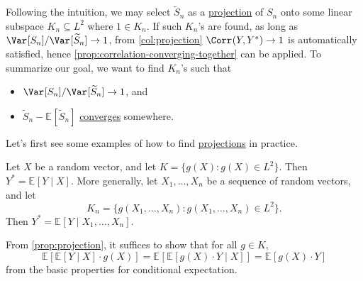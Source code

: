 Following the intuition, we may select \(\widetilde{S} _n\) as a \hyperref[def:projection]{projection} of \(S_n\) onto some linear subspace \(K_n \subseteq L^2\) where \(1 \in K_n\). If such \(K_n\)'s are found, as long as \(\Var_{}[S_n] / \Var_{}[\widetilde{S} _n] \to 1\), from \autoref{col:projection} \(\Corr_{}(Y, Y^{\ast} ) \to 1\) is automatically satisfied, hence \autoref{prop:correlation-converging-together} can be applied. To summarize our goal, we want to find \(K_n\)'s such that
\begin{itemize}
	\item \(\Var_{}[S_n] / \Var_{}[\widetilde{S} _n] \to 1\), and
	\item \(\widetilde{S} _n - \mathbb{E}_{}[\widetilde{S} _n] \) \hyperref[def:converge-in-distribution]{converges} somewhere.
\end{itemize}

Let's first see some examples of how to find \hyperref[def:projection]{projections} in practice.

\begin{eg}
	Let \(X\) be a random vector, and let \(K = \{ g(X) \colon g(X) \in L^2 \} \). Then \(Y^{\ast} = \mathbb{E}_{}[Y \mid X] \). More generally, let \(X_1, \dots , X_n\) be a sequence of random vectors, and let
	\[
		K_n = \{ g(X_1, \dots , X_n) \colon g(X_1, \dots , X_n) \in L^2\}.
	\]
	Then \(Y^{\ast} = \mathbb{E}_{}[Y \mid X_1, \dots , X_n] \).
\end{eg}
\begin{explanation}
	From \autoref{prop:projection}, it suffices to show that for all \(g \in K\),
	\[
		\mathbb{E}_{}[\mathbb{E}_{}[Y \mid X] \cdot g(X)]
		= \mathbb{E}_{}[\mathbb{E}_{}[g(X) \cdot Y \mid X] ]
		= \mathbb{E}_{}[g(X) \cdot Y]
	\]
	from the basic properties for conditional expectation.
\end{explanation}


